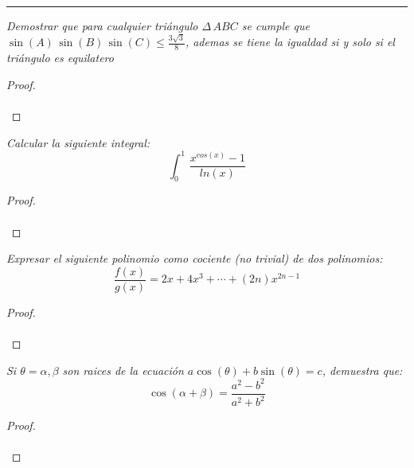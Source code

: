 \documentclass[11pt,letterpaper]{article}
\begin{document}
\rule{17cm}{0.1mm}

\begin{tcolorbox}[title=Problema 1, colframe=G, coltitle=B, fonttitle=\bfseries]
\textit{Demostrar que para cualquier tri\'angulo $\Delta\,ABC$ se cumple que $\sin(A)\,\sin(B)\,\sin(C)\leq\frac{3\sqrt{3}}{8}$, ademas se tiene la igualdad si y solo si el tri\'angulo es
equilatero}  
\end{tcolorbox}
\begin{proof}\,\\
    \,\\
\end{proof}
\begin{tcolorbox}[title=Problema 2, colframe=G, coltitle=B, fonttitle=\bfseries]
\textit{Calcular la siguiente integral:
\begin{equation*}
    \int_{0}^{1}\,\frac{x^{cos(x)}-1}{ln(x)}
\end{equation*}}  
\end{tcolorbox}
\begin{proof}\,\\
    \,\\
\end{proof}
\begin{tcolorbox}[title=Problema 3, colframe=G, coltitle=B, fonttitle=\bfseries]
\textit{Expresar el siguiente polinomio como cociente (no trivial) de dos polinomios:
\begin{equation*}
  \frac{f(x)}{g(x)}=2x+4x^3+\cdots+(2n)x^{2n-1}
\end{equation*}}  
\end{tcolorbox}
\begin{proof}\,\\
    \,\\
\end{proof}
\begin{tcolorbox}[title=Problema 4, colframe=G, coltitle=B, fonttitle=\bfseries]
\textit{Si $\theta=\alpha,\beta$ son raices de la ecuaci\'on $a\cos(\theta)+b\sin(\theta)=c$, demuestra que:
\begin{equation*}
  \cos(\alpha+\beta)=\frac{a^2-b^2}{a^2+b^2}
\end{equation*}}  
\end{tcolorbox}
\begin{proof}\,\\
    \,\\
\end{proof}
\end{document}
